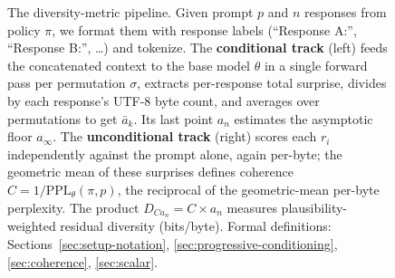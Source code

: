 \begin{figure}[tbp]
\caption{The diversity-metric pipeline.
Given prompt $p$ and $n$ responses from policy $\pi$, we format them with response labels (``Response A:'', ``Response B:'', \ldots) and tokenize.
The \textcolor{orange!70!black}{\textbf{conditional track}} (left) feeds the concatenated context to the base model $\theta$ in a single forward pass per permutation $\sigma$, extracts per-response total surprise, divides by each response's UTF-8 byte count, and averages over permutations to get $\bar a_k$.
Its last point $a_n$ estimates the asymptotic floor $a_\infty$.
The \textcolor{blue!70!black}{\textbf{unconditional track}} (right) scores each $r_i$ independently against the prompt alone, again per-byte; the geometric mean of these surprises defines coherence $C = 1/\mathrm{PPL}_\theta(\pi, p)$, the reciprocal of the geometric-mean per-byte perplexity.
The product $D_{Ca_n} = C \times a_n$ measures plausibility-weighted residual diversity (bits/byte).
Formal definitions: Sections~\ref{sec:setup-notation}, \ref{sec:progressive-conditioning}, \ref{sec:coherence}, \ref{sec:scalar}.}
\label{fig:pipeline}
\end{figure}

